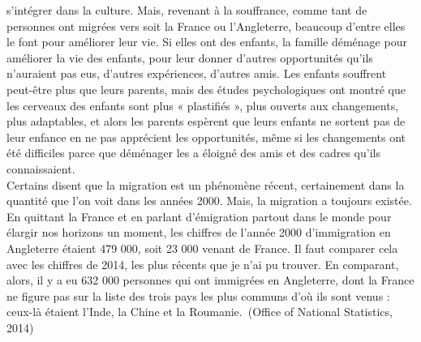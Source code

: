 \documentclass[12pt]{article}
\begin{document}
s'intégrer dans la culture. Mais, revenant à la souffrance, comme tant
de personnes ont migrées vers soit la France ou l'Angleterre, beaucoup
d'entre elles le font pour améliorer leur vie. Si elles ont des
enfants, la famille déménage pour améliorer la vie des enfants, pour
leur donner d'autres opportunités qu'ils n'auraient pas eus, d'autres
expériences, d'autres amis. Les enfants souffrent peut-être plus que
leurs parents, mais des études psychologiques ont montré que les
cerveaux des enfants sont plus « plastifiés », plus ouverts aux
changements, plus adaptables, et alors les parents espèrent que leurs
enfants ne sortent pas de leur enfance en ne pas apprécient les
opportunités, même si les changements ont été difficiles parce que
déménager les a éloigné des amis et des cadres qu'ils connaissaient.\\

Certains disent que la migration est un phénomène récent,
certainement dans la quantité que l'on voit dans les années 2000.
Mais, la migration a toujours existée. En quittant la France et en
parlant d'émigration partout dans le monde pour élargir nos horizons
un moment, les chiffres de l'année 2000 d'immigration en Angleterre
étaient 479 000, soit 23 000 venant de France. Il faut comparer cela
avec les chiffres de 2014, les plus récents que je n'ai pu trouver. En
comparant, alors, il y a eu 632 000 personnes qui ont immigrées en
Angleterre, dont la France ne figure pas sur la liste des trois pays
les plus communs d'où ils sont venus : ceux-là étaient l'Inde, la
Chine et la Roumanie.~(Office of National Statistics, 2014)\\
\end{document}
